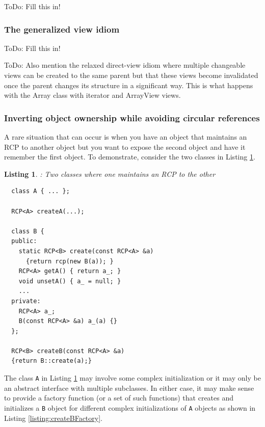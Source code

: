 \documentclass[pdf,ps2pdf,11pt]{SANDreport}
\newtheorem{listing}{Listing}
\begin{document}
ToDo: Fill this in!


%
{}\subsubsection{The generalized view idiom}
\label{sec:generalized-view-idiom}
%

ToDo: Fill this in!

ToDo: Also mention the relaxed direct-view idiom where multiple
changeable views can be created to the same parent but that these
views become invalidated once the parent changes its structure in a
significant way.  This is what happens with the Array class with
iterator and ArrayView views.


%
{}\subsubsection{Inverting object ownership while avoiding circular references}
\label{sec:inverting-obj-ownership}
%

A rare situation that can occur is when you have an object that
maintains an RCP to another object but you want to expose the second
object and have it remember the first object.  To demonstrate,
consider the two classes in Listing {}\ref{listing:B_owns_A_decl}.

\begin{listing}: Two classes where one maintains an RCP to the other \\
\label{listing:B_owns_A_decl}
{\small\begin{verbatim}
  class A { ... };

  RCP<A> createA(...);

  class B {
  public:
    static RCP<B> create(const RCP<A> &a)
      {return rcp(new B(a)); }
    RCP<A> getA() { return a_; }
    void unsetA() { a_ = null; }
    ...
  private:
    RCP<A> a_;
    B(const RCP<A> &a) a_(a) {}
  };

  RCP<B> createB(const RCP<A> &a)
  {return B::create(a);}
\end{verbatim}}
\end{listing}

The class {}\texttt{A} in Listing {}\ref{listing:B_owns_A_decl} may
involve some complex initialization or it may only be an abstract
interface with multiple subclasses.  In either case, it may make sense
to provide a factory function (or a set of such functions) that
creates and initializes a {}\texttt{B} object for different complex
initializations of {}\texttt{A} objects as shown in Listing
{}\ref{listing:createBFactory}.
\end{document}
